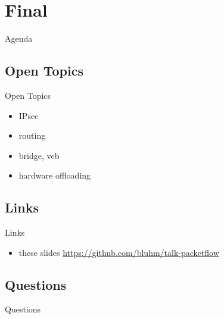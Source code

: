 \documentclass[14pt]{beamer}
\begin{document}
\section{Final}
\begin{frame}{Agenda}
\tableofcontents[currentsection]
\end{frame}

\subsection{Open Topics}
\begin{frame}{Open Topics}
\begin{itemize}
  \item	IPsec
  \item routing
  \item	bridge, veb
  \item hardware offloading
\end{itemize}
\end{frame}

\subsection{Links}
\begin{frame}{Links}
\begin{itemize}
  \item these slides
    {\small \url{https://github.com/bluhm/talk-packetflow}}
\end{itemize}
\end{frame}

\subsection{Questions}
\begin{frame}{Questions}
\begin{center}
\end{center}
\end{frame}
\end{document}
